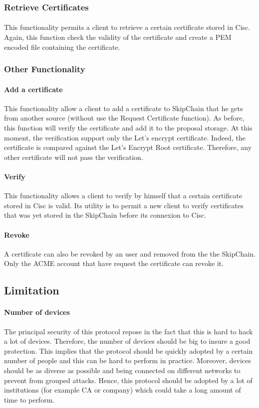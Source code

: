 \documentclass[11pt, a4paper, twoside, openright]{article}
\begin{document}
\subsubsection{Retrieve Certificates}
\paragraph{}This functionality permits a client to retrieve a certain certificate stored in Cisc. Again, this function check the validity of the certificate and create a PEM encoded file containing the certificate.
\subsubsection{Other Functionality}
\paragraph{Add a certificate}
This functionality allow a client to add a certificate to SkipChain that he gets from another source (without use the Request Certificate function). As before, this function will verify the certificate and add it to the proposal storage. At this moment, the verification support only the Let's encrypt certificate. Indeed, the certificate is compared against the Let's Encrypt Root certificate. Therefore, any other certificate will not pass the verification.
\paragraph{Verify}
This functionality allows a client to verify by himself that a certain certificate stored in Cisc is valid. Its utility is to permit a new client to verify certificates that was yet stored in the SkipChain before its connexion to Cisc.
\paragraph{Revoke}
A certificate can also be revoked by an user and removed from the the SkipChain. Only the ACME account that have request the certificate can revoke it.  

           
\subsection{Limitation}
\paragraph{Number of devices}
The principal security of this protocol repose in the fact that this is hard to hack a lot of devices. Therefore, the number of devices should be big to insure a good protection. This implies that the protocol should be quickly adopted by a certain number of people and this can be hard to perform in practice. Moreover, devices should be as diverse as possible and being connected on different networks to prevent from grouped attacks. Hence, this protocol should be adopted by a lot of institutions (for example CA or company) which could take a long amount of time to perform.
\end{document}
